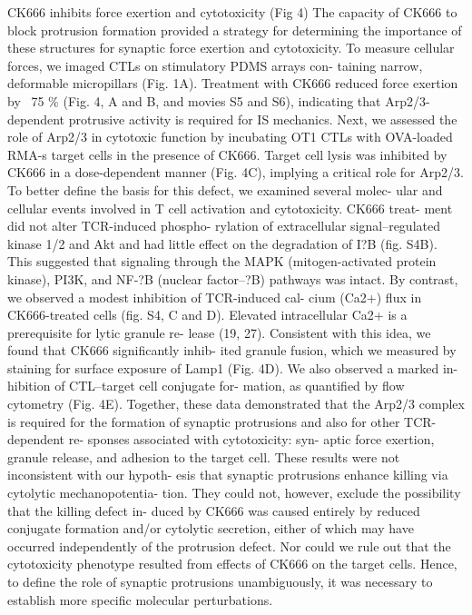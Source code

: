 CK666 inhibits force exertion and cytotoxicity (Fig 4)
The capacity of CK666 to block protrusion formation provided
a strategy for determining the importance of these structures for synaptic force exertion and cytotoxicity. To measure cellular forces, we imaged CTLs on stimulatory PDMS arrays con- taining narrow, deformable micropillars (Fig. 1A). Treatment with CK666 reduced force exertion by ~75
\% (Fig. 4, A and B, and movies S5 and S6), indicating that Arp2/3-dependent protrusive activity is required for IS mechanics. Next, we assessed the role of Arp2/3 in cytotoxic function by incubating OT1 CTLs with OVA-loaded RMA-s target cells in the presence of CK666. Target cell lysis was inhibited by CK666 in a dose-dependent manner (Fig. 4C), implying a critical role for Arp2/3. To better define the basis for this defect, we examined several molec- ular and cellular events involved in T cell activation and cytotoxicity. CK666 treat- ment did not alter TCR-induced phospho- rylation of extracellular signal–regulated kinase 1/2 and Akt and had little effect on the degradation of I?B (fig. S4B). This suggested that signaling through the MAPK (mitogen-activated protein kinase), PI3K, and NF-?B (nuclear factor–?B) pathways was intact. By contrast, we observed a modest inhibition of TCR-induced cal- cium (Ca2+) flux in CK666-treated cells (fig. S4, C and D). Elevated intracellular Ca2+ is a prerequisite for lytic granule re- lease (19, 27). Consistent with this idea, we found that CK666 significantly inhib- ited granule fusion, which we measured by staining for surface exposure of Lamp1 (Fig. 4D). We also observed a marked in- hibition of CTL–target cell conjugate for- mation, as quantified by flow cytometry (Fig. 4E).
Together, these data demonstrated that the Arp2/3 complex is required for the formation of synaptic protrusions and also for other TCR-dependent re- sponses associated with cytotoxicity: syn- aptic force exertion, granule release, and adhesion to the target cell. These results were not inconsistent with our hypoth- esis that synaptic protrusions enhance killing via cytolytic mechanopotentia- tion. They could not, however, exclude the possibility that the killing defect in- duced by CK666 was caused entirely by reduced conjugate formation and/or cytolytic secretion, either of which may have occurred independently of the protrusion defect. Nor could we rule out that the cytotoxicity phenotype resulted from effects of CK666 on the target cells. Hence, to define the role of synaptic protrusions unambiguously, it was necessary to establish more specific molecular perturbations.


